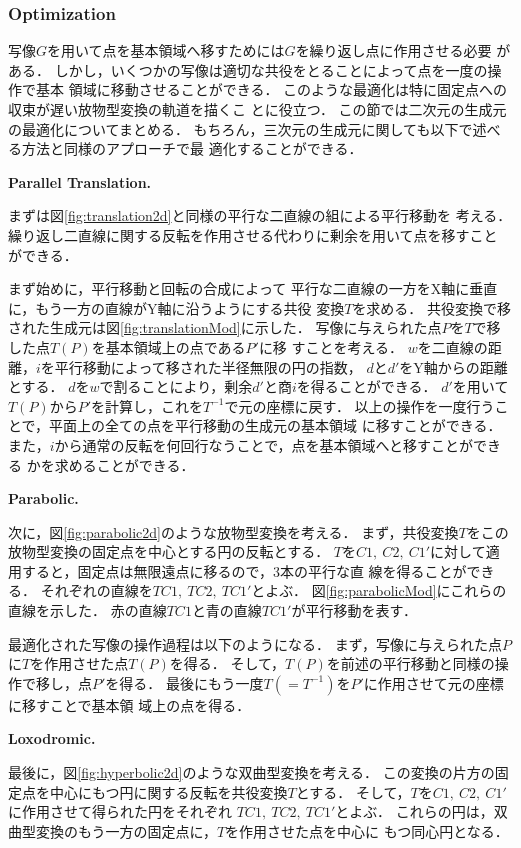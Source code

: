 \subsubsection{Optimization}

写像$G$を用いて点を基本領域へ移すためには$G$を繰り返し点に作用させる必要
がある．
しかし，いくつかの写像は適切な共役をとることによって点を一度の操作で基本
領域に移動させることができる．
このような最適化は特に固定点への収束が遅い放物型変換の軌道を描くこ
とに役立つ．
この節では二次元の生成元の最適化についてまとめる．
もちろん，三次元の生成元に関しても以下で述べる方法と同様のアプローチで最
適化することができる．

\noindent\textbf{Parallel Translation.}

まずは図\ref{fig:translation2d}と同様の平行な二直線の組による平行移動を
考える．
繰り返し二直線に関する反転を作用させる代わりに剰余を用いて点を移すこと
ができる．

まず始めに，平行移動と回転の合成によって
平行な二直線の一方をX軸に垂直に，もう一方の直線がY軸に沿うようにする共役
変換$T$を求める．
共役変換で移された生成元は図\ref{fig:translationMod}に示した．
写像に与えられた点$P$を$T$で移した点$T(P)$を基本領域上の点である$P'$に移
すことを考える．
$w$を二直線の距離，$i$を平行移動によって移された半径無限の円の指数，
$d$と$d'$をY軸からの距離とする．
$d$を$w$で割ることにより，剰余$d'$と商$i$を得ることができる．
$d'$を用いて$T(P)$から$P'$を計算し，これを$T^{-1}$で元の座標に戻す．
以上の操作を一度行うことで，平面上の全ての点を平行移動の生成元の基本領域
に移すことができる．
また，$i$から通常の反転を何回行なうことで，点を基本領域へと移すことができる
かを求めることができる．

\noindent\textbf{Parabolic.}

次に，図\ref{fig:parabolic2d}のような放物型変換を考える．
まず，共役変換$T$をこの放物型変換の固定点を中心とする円の反転とする．
$T$を$C1,~C2,~C1'$に対して適用すると，固定点は無限遠点に移るので，3本の平行な直
線を得ることができる．
それぞれの直線を$TC1,~TC2,~TC1'$とよぶ．
図\ref{fig:parabolicMod}にこれらの直線を示した．
赤の直線$TC1$と青の直線$TC1'$が平行移動を表す．

最適化された写像の操作過程は以下のようになる．
まず，写像に与えられた点${P}$に$T$を作用させた点$T(P)$を得る．
そして，$T(P)$を前述の平行移動と同様の操作で移し，点$P'$を得る．
最後にもう一度$T(= T^{-1})$を$P'$に作用させて元の座標に移すことで基本領
域上の点を得る．

\noindent\textbf{Loxodromic.}

最後に，図\ref{fig:hyperbolic2d}のような双曲型変換を考える．
この変換の片方の固定点を中心にもつ円に関する反転を共役変換$T$とする．
そして，$T$を$C1,~C2,~C1'$に作用させて得られた円をそれぞれ
$TC1,~TC2,~TC1'$とよぶ．
これらの円は，双曲型変換のもう一方の固定点に，$T$を作用させた点を中心に
もつ同心円となる．

